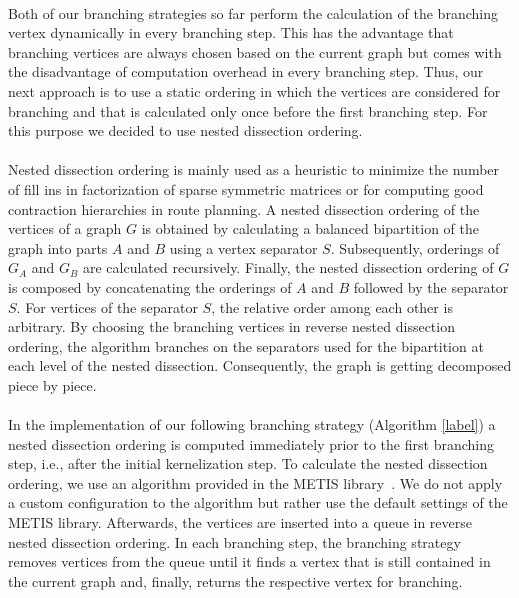 \documentclass[]{article}
\begin{document}
\paragraph{}
Both of our branching strategies so far perform the calculation of the branching vertex dynamically in every branching step. This has the advantage that branching vertices are always chosen based on the current graph but comes with the disadvantage of computation overhead in every branching step. Thus, our next approach is to use a static ordering in which the vertices are considered for branching and that is calculated only once before the first branching step. For this purpose we decided to use nested dissection ordering.

\paragraph{}
Nested dissection ordering is mainly used as a heuristic to minimize the number of fill ins in factorization of sparse symmetric matrices or for computing good contraction hierarchies in route planning.  A nested dissection ordering of the vertices of a graph $G$ is obtained by calculating a balanced bipartition of the graph into parts $A$ and $B$ using a vertex separator $S$. Subsequently, orderings of $G_A$ and $G_B$ are calculated recursively. Finally, the nested dissection ordering of $G$ is composed by concatenating the orderings of $A$ and $B$ followed by the separator $S$. For vertices of the separator $S$, the relative order among each other is arbitrary. By choosing the branching vertices in reverse nested dissection ordering, the algorithm branches on the separators used for the bipartition at each level of the nested dissection. Consequently, the graph is getting decomposed piece by piece.

\paragraph{}
In the implementation of our following branching strategy (Algorithm \ref{label}) a nested dissection ordering is computed immediately prior to the first branching step, i.e., after the initial kernelization step. To calculate the nested dissection ordering, we use an algorithm provided in the METIS library~\cite{bibid}. We do not apply a custom configuration to the algorithm but rather use the default settings of the METIS library. Afterwards, the vertices are inserted into a queue in reverse nested dissection ordering. In each branching step, the branching strategy removes vertices from the queue until it finds a vertex that is still contained in the current graph and, finally, returns the respective vertex for branching.
\end{document}
